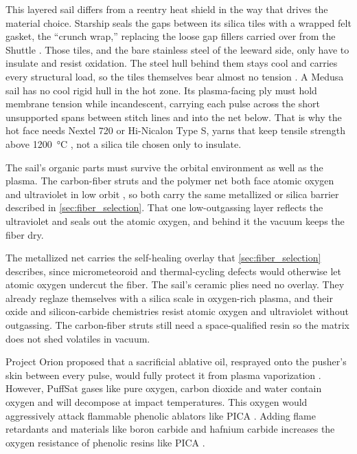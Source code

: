 \documentclass{article}
\begin{document}
This layered sail differs from a reentry heat shield in the way that drives the material choice. Starship seals the gaps between its silica tiles with a wrapped felt gasket, the ``crunch wrap,'' replacing the loose gap fillers carried over from the Shuttle \cite{starship_crunchwrap}. Those tiles, and the bare stainless steel of the leeward side, only have to insulate and resist oxidation. The steel hull behind them stays cool and carries every structural load, so the tiles themselves bear almost no tension \cite{starship}. A Medusa sail has no cool rigid hull in the hot zone. Its plasma-facing ply must hold membrane tension while incandescent, carrying each pulse across the short unsupported spans between stitch lines and into the net below. That is why the hot face needs Nextel 720 or Hi-Nicalon Type S, yarns that keep tensile strength above \SI{1200}{\celsius} \cite{nextel_720_hot_tensile, hi_nicalon_sic}, not a silica tile chosen only to insulate.

The sail's organic parts must survive the orbital environment as well as the plasma. The carbon-fiber struts and the polymer net both face atomic oxygen and ultraviolet in low orbit \cite{ao_protection_banks}, so both carry the same metallized or silica barrier described in \autoref{sec:fiber_selection}. That one low-outgassing layer reflects the ultraviolet and seals out the atomic oxygen, and behind it the vacuum keeps the fiber dry.

The metallized net carries the self-healing overlay that \autoref{sec:fiber_selection} describes, since micrometeoroid and thermal-cycling defects would otherwise let atomic oxygen undercut the fiber. The sail's ceramic plies need no overlay. They already reglaze themselves with a silica scale in oxygen-rich plasma, and their oxide and silicon-carbide chemistries resist atomic oxygen and ultraviolet without outgassing. The carbon-fiber struts still need a space-qualified resin so the matrix does not shed volatiles in vacuum.

Project Orion proposed that a sacrificial ablative oil, resprayed onto the pusher's skin between every pulse, would fully protect it from plasma vaporization \cite{projorion, ga5009_vol3}. However, PuffSat gases like pure oxygen, carbon dioxide and water contain oxygen and will decompose at impact temperatures. This oxygen would aggressively attack flammable phenolic ablators like PICA \cite{pica_ablator_milos2010}. Adding flame retardants and materials like boron carbide and hafnium carbide increases the oxygen resistance of phenolic resins like PICA \cite{phenolic_oxidation_hfc_b4c}.
\end{document}
